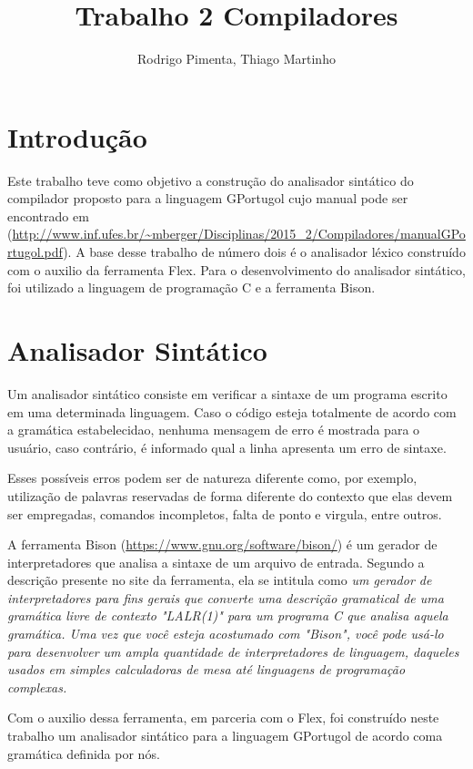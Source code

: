 \documentclass[
12pt,				%
a4paper,			%
english,			%
french,				%
spanish,			%
brazil,				%
article
]{abntex2}
\title{Trabalho 2 Compiladores}
\author{Rodrigo Pimenta, Thiago Martinho}
\begin{document}
\maketitle

\section{Introdução}

Este trabalho teve como objetivo a construção do analisador sintático do  compilador proposto para a linguagem GPortugol cujo manual pode ser encontrado em (\url{http://www.inf.ufes.br/~mberger/Disciplinas/2015_2/Compiladores/manualGPortugol.pdf}). A base desse trabalho de número dois é o analisador léxico construído com o auxilio da ferramenta Flex.
Para o desenvolvimento do analisador sintático, foi utilizado a linguagem de programação C e a ferramenta Bison.


\section{Analisador Sintático}

Um analisador sintático consiste em verificar a sintaxe de um programa escrito em uma determinada linguagem. Caso o código esteja totalmente de acordo com a gramática estabelecidao, nenhuma mensagem de erro é mostrada para o usuário, caso contrário, é informado qual a linha apresenta um erro de sintaxe.

Esses possíveis erros podem ser de natureza diferente como, por exemplo, utilização de palavras reservadas de forma diferente do contexto que elas devem ser empregadas, comandos incompletos, falta de ponto e virgula, entre outros. 

A ferramenta Bison (\url{https://www.gnu.org/software/bison/}) é um gerador de interpretadores que analisa a sintaxe de um arquivo de entrada. Segundo a descrição presente no site da ferramenta, ela se intitula como \textit{um gerador de interpretadores para fins gerais que converte uma descrição gramatical de uma gramática livre de contexto "LALR(1)" para um programa C que analisa aquela gramática. Uma vez que você esteja acostumado com "Bison", você pode usá-lo para desenvolver um ampla quantidade de interpretadores de linguagem, daqueles usados em simples calculadoras de mesa até linguagens de programação complexas.}

Com o auxilio dessa ferramenta, em parceria com o Flex, foi construído neste trabalho um analisador sintático para a linguagem GPortugol de acordo coma  gramática definida por nós.
\end{document}
